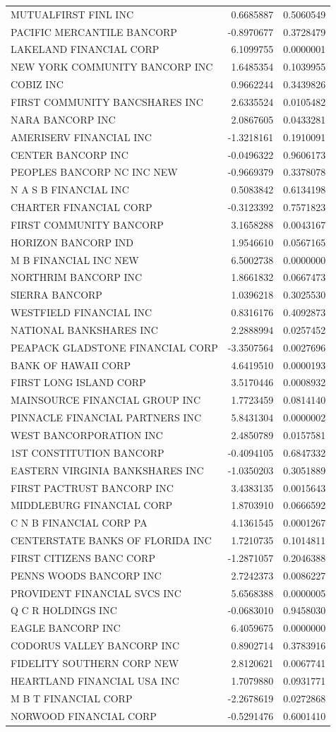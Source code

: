 \documentclass[11pt,]{article}
\begin{document}
\begin{longtable}[]{@{}lrr@{}}
MUTUALFIRST FINL INC & 0.6685887 & 0.5060549\tabularnewline
PACIFIC MERCANTILE BANCORP & -0.8970677 & 0.3728479\tabularnewline
LAKELAND FINANCIAL CORP & 6.1099755 & 0.0000001\tabularnewline
NEW YORK COMMUNITY BANCORP INC & 1.6485354 & 0.1039955\tabularnewline
COBIZ INC & 0.9662244 & 0.3439826\tabularnewline
FIRST COMMUNITY BANCSHARES INC & 2.6335524 & 0.0105482\tabularnewline
NARA BANCORP INC & 2.0867605 & 0.0433281\tabularnewline
AMERISERV FINANCIAL INC & -1.3218161 & 0.1910091\tabularnewline
CENTER BANCORP INC & -0.0496322 & 0.9606173\tabularnewline
PEOPLES BANCORP NC INC NEW & -0.9669379 & 0.3378078\tabularnewline
N A S B FINANCIAL INC & 0.5083842 & 0.6134198\tabularnewline
CHARTER FINANCIAL CORP & -0.3123392 & 0.7571823\tabularnewline
FIRST COMMUNITY BANCORP & 3.1658288 & 0.0043167\tabularnewline
HORIZON BANCORP IND & 1.9546610 & 0.0567165\tabularnewline
M B FINANCIAL INC NEW & 6.5002738 & 0.0000000\tabularnewline
NORTHRIM BANCORP INC & 1.8661832 & 0.0667473\tabularnewline
SIERRA BANCORP & 1.0396218 & 0.3025530\tabularnewline
WESTFIELD FINANCIAL INC & 0.8316176 & 0.4092873\tabularnewline
NATIONAL BANKSHARES INC & 2.2888994 & 0.0257452\tabularnewline
PEAPACK GLADSTONE FINANCIAL CORP & -3.3507564 & 0.0027696\tabularnewline
BANK OF HAWAII CORP & 4.6419510 & 0.0000193\tabularnewline
FIRST LONG ISLAND CORP & 3.5170446 & 0.0008932\tabularnewline
MAINSOURCE FINANCIAL GROUP INC & 1.7723459 & 0.0814140\tabularnewline
PINNACLE FINANCIAL PARTNERS INC & 5.8431304 & 0.0000002\tabularnewline
WEST BANCORPORATION INC & 2.4850789 & 0.0157581\tabularnewline
1ST CONSTITUTION BANCORP & -0.4094105 & 0.6847332\tabularnewline
EASTERN VIRGINIA BANKSHARES INC & -1.0350203 & 0.3051889\tabularnewline
FIRST PACTRUST BANCORP INC & 3.4383135 & 0.0015643\tabularnewline
MIDDLEBURG FINANCIAL CORP & 1.8703910 & 0.0666592\tabularnewline
C N B FINANCIAL CORP PA & 4.1361545 & 0.0001267\tabularnewline
CENTERSTATE BANKS OF FLORIDA INC & 1.7210735 & 0.1014811\tabularnewline
FIRST CITIZENS BANC CORP & -1.2871057 & 0.2046388\tabularnewline
PENNS WOODS BANCORP INC & 2.7242373 & 0.0086227\tabularnewline
PROVIDENT FINANCIAL SVCS INC & 5.6568388 & 0.0000005\tabularnewline
Q C R HOLDINGS INC & -0.0683010 & 0.9458030\tabularnewline
EAGLE BANCORP INC & 6.4059675 & 0.0000000\tabularnewline
CODORUS VALLEY BANCORP INC & 0.8902714 & 0.3783916\tabularnewline
FIDELITY SOUTHERN CORP NEW & 2.8120621 & 0.0067741\tabularnewline
HEARTLAND FINANCIAL USA INC & 1.7079880 & 0.0931771\tabularnewline
M B T FINANCIAL CORP & -2.2678619 & 0.0272868\tabularnewline
NORWOOD FINANCIAL CORP & -0.5291476 & 0.6001410\tabularnewline

\end{longtable}
\end{document}
